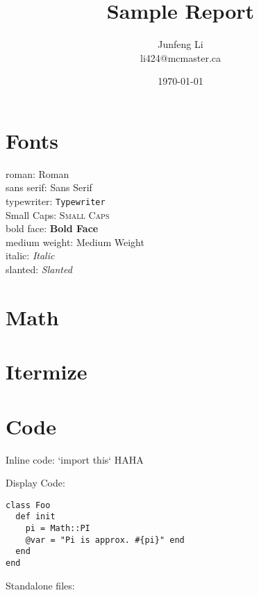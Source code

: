 \documentclass{article}
\title{Sample Report}
\author{Junfeng Li \\ li424@mcmaster.ca}
\date{\today}
\begin{document}
\maketitle

\section{Fonts}

roman: \textrm{Roman} \\
sans serif: \textsf{Sans Serif} \\
typewriter: \texttt{Typewriter} \\
Small Caps: \textsc{Small Caps} \\
bold face: \textbf{Bold Face} \\
medium weight: \textmd{Medium Weight} \\
italic: \textit{Italic} \\
slanted: \textsl{Slanted} \\

\blindmathtrue
\blindtext

\section{Math}

\blindmathpaper

\section{Itermize}

\blinditemize
\blindenumerate
\blinddescription

\section{Code}

Inline code: `import this` HAHA

Display Code:

\begin{verbatim}
class Foo
  def init
    pi = Math::PI
    @var = "Pi is approx. #{pi}" end
  end
end
\end{verbatim}

Standalone files:

\inputminted{python}{code-example.py}
\end{document}
